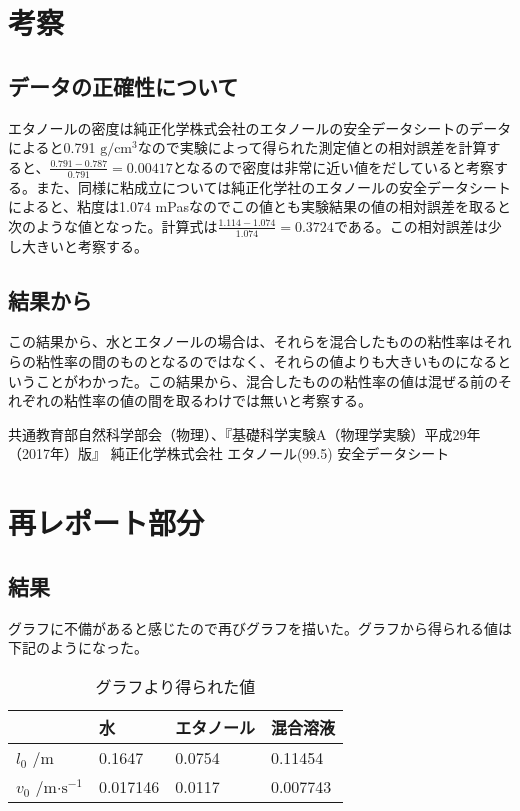 \documentclass{jsarticle}
\begin{document}
\section{考察}

\subsection{データの正確性について}
エタノールの密度は純正化学株式会社のエタノールの安全データシートのデータによると0.791 $\textrm{g}/\textrm{cm}^3$なので実験によって得られた測定値との相対誤差を計算すると、$\frac{0.791 - 0.787}{0.791} = 0.00417$となるので密度は非常に近い値をだしていると考察する。また、同様に粘成立については純正化学社のエタノールの安全データシートによると、粘度は1.074 mPasなのでこの値とも実験結果の値の相対誤差を取ると次のような値となった。計算式は$\frac{1.114 - 1.074}{1.074} = 0.3724$である。この相対誤差は少し大きいと考察する。

\subsection{結果から}
この結果から、水とエタノールの場合は、それらを混合したものの粘性率はそれらの粘性率の間のものとなるのではなく、それらの値よりも大きいものになるということがわかった。この結果から、混合したものの粘性率の値は混ぜる前のそれぞれの粘性率の値の間を取るわけでは無いと考察する。




\begin{thebibliography}{99}
     共通教育部自然科学部会（物理）、『基礎科学実験A（物理学実験）平成29年（2017年）版』
     純正化学株式会社 エタノール(99.5) 安全データシート
\end{thebibliography}


\newpage

\section{再レポート部分}

\subsection{結果}

グラフに不備があると感じたので再びグラフを描いた。グラフから得られる値は下記のようになった。

\begin{table}[H]
\centering
\caption{グラフより得られた値}
\label{my-label}
\begin{tabular}{|l|l|l|l|}
\hline
   & 水        & エタノール  & 混合溶液     \\ \hline
$l_0$ /m & 0.1647   & 0.0754 & 0.11454  \\ \hline
$v_0$ /m$\cdot\textrm{s}^{-1}$& 0.017146 & 0.0117 & 0.007743 \\ \hline
\end{tabular}
\end{table}
\end{document}
